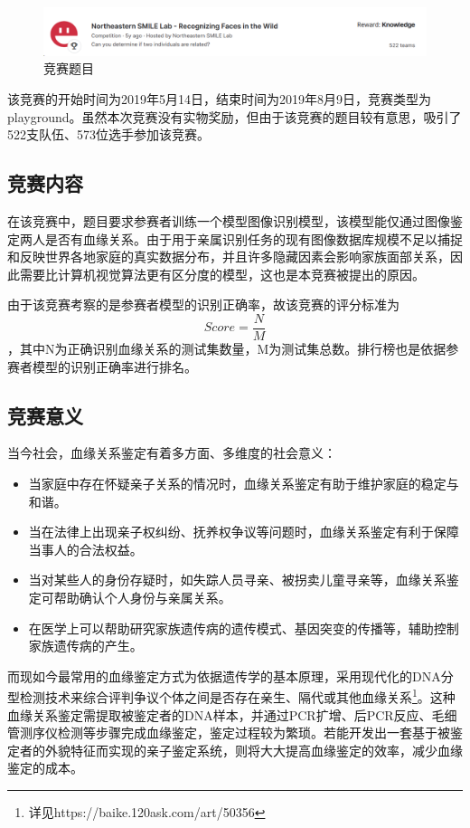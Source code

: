 \documentclass[UTF8]{ctexart}
\begin{document}
\begin{figure}[!ht]
  \centering
  \includegraphics[width=1\textwidth]{competition.png}
  \caption{竞赛题目}
  \label{fig:competition}
\end{figure}

该竞赛的开始时间为2019年5月14日，结束时间为2019年8月9日，竞赛类型为playground。虽然本次竞赛没有实物奖励，但由于该竞赛的题目较有意思，吸引了522支队伍、573位选手参加该竞赛。

\subsection{竞赛内容}
在该竞赛中，题目要求参赛者训练一个模型图像识别模型，该模型能仅通过图像鉴定两人是否有血缘关系。由于用于亲属识别任务的现有图像数据库规模不足以捕捉和反映世界各地家庭的真实数据分布，并且许多隐藏因素会影响家族面部关系，因此需要比计算机视觉算法更有区分度的模型，这也是本竞赛被提出的原因。

由于该竞赛考察的是参赛者模型的识别正确率，故该竞赛的评分标准为\[Score=\frac{N}{M}\]，其中N为正确识别血缘关系的测试集数量，M为测试集总数。排行榜也是依据参赛者模型的识别正确率进行排名。

\subsection{竞赛意义}
当今社会，血缘关系鉴定有着多方面、多维度的社会意义：
\begin{itemize}
  \item 当家庭中存在怀疑亲子关系的情况时，血缘关系鉴定有助于维护家庭的稳定与和谐。
  \item 当在法律上出现亲子权纠纷、抚养权争议等问题时，血缘关系鉴定有利于保障当事人的合法权益。
  \item 当对某些人的身份存疑时，如失踪人员寻亲、被拐卖儿童寻亲等，血缘关系鉴定可帮助确认个人身份与亲属关系。
  \item 在医学上可以帮助研究家族遗传病的遗传模式、基因突变的传播等，辅助控制家族遗传病的产生。
\end{itemize}

而现如今最常用的血缘鉴定方式为依据遗传学的基本原理，采用现代化的DNA分型检测技术来综合评判争议个体之间是否存在亲生、隔代或其他血缘关系\footnote{详见https://baike.120ask.com/art/50356}。这种血缘关系鉴定需提取被鉴定者的DNA样本，并通过PCR扩增、后PCR反应、毛细管测序仪检测等步骤完成血缘鉴定，鉴定过程较为繁琐。若能开发出一套基于被鉴定者的外貌特征而实现的亲子鉴定系统，则将大大提高血缘鉴定的效率，减少血缘鉴定的成本。
\end{document}
